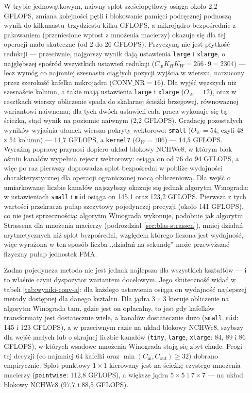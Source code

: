 \documentclass[a4paper,12pt]{book} %
\begin{document}
W trybie jednowątkowym, naiwny splot sześciopętlowy osiąga około 2,2 GFLOPS, zmiana kolejności pętli i blokowanie pamięci podręcznej podnoszą wynik do kilkunastu--trzydziestu kilku GFLOPS, a mikrojądro bezpośrednie z pakowaniem (przeniesione wprost z mnożenia macierzy) okazuje się dla tej operacji mało skuteczne (od 2 do 26 GFLOPS). Przyczyną nie jest płytkość redukcji --- przeciwnie, najgorszy wynik dają ustawienia \texttt{large} i \texttt{xlarge}, o najgłębszej spośród wszystkich ustawień redukcji ($C_{\mathrm{in}} K_H K_W = 256 \cdot 9 = 2304$) --- lecz wymóg co najmniej szesnastu ciągłych pozycji wyjścia w wierszu, narzucony przez szerokość kafelka mikrojądra ($\mathrm{CONV\_NR} = 16$). Dla wyjść węższych niż szesnaście kolumn, a takie mają ustawienia \texttt{large} i \texttt{xlarge} ($O_W = 12$), oraz w resztkach wierszy obliczenie spada do skalarnej ścieżki brzegowej, równoważnej wariantowi naiwnemu; dla tych dwóch ustawień cała praca wykonuje się tą ścieżką, stąd wynik na poziomie naiwnym (2,2 GFLOPS). Gradację pozostałych wyników wyjaśnia ułamek wiersza pokryty wektorowo: \texttt{small} ($O_W = 54$, czyli 48 z 54 kolumn) --- 11,7 GFLOPS, a \texttt{kernel7} ($O_W = 106$) --- 14,5 GFLOPS. Wyraźną poprawę przynosi dopiero układ blokowy NCHWc8, w którym blok ośmiu kanałów wypełnia rejestr wektorowy: osiąga on od 76 do 94 GFLOPS, a więc po raz pierwszy doprowadza splot bezpośredni w pobliże wydajności charakterystycznej dla operacji ograniczonej mocą obliczeniową. Dla wejść o umiarkowanej liczbie kanałów najszybszy okazuje się jednak algorytm Winograda: w ustawieniach \texttt{small} i \texttt{mid} osiąga on 145,1 oraz 123,2 GFLOPS. Pierwsza z tych wartości przekracza pułap szczytowy pojedynczej precyzji (około 141 GFLOPS), co nie jest sprzecznością: algorytm Winograda wykonuje, podobnie jak algorytm Strassena dla mnożenia macierzy (podrozdział \ref{sec:blas-strassen}), mniej działań arytmetycznych niż splot bezpośredni, względem którego liczona jest wydajność, więc wyrażona w ten sposób liczba ,,działań na sekundę'' może przewyższać fizyczny pułap jednostek FMA.

Żadna pojedyncza metoda nie jest jednak najlepsza dla wszystkich kształtów --- i to właśnie czyni dyspozytor wariantem docelowym. Jego skuteczność widać w tabeli \ref{tab:wyniki-conv-a}: dla każdego ustawienia osiąga on wydajność najlepszej metody dostępnej dla danego kształtu. Dla jądra $3 \times 3$ kieruje obliczenie na algorytm Winograda tam, gdzie jest on opłacalny, to jest gdy kafelków transformaty jest dostatecznie wiele, a kanałów dostatecznie dużo (\texttt{small}, \texttt{mid}: 145 i 123 GFLOPS), a w przeciwnym razie na układ blokowy NCHWc8, szybszy dla wejść małych lub o skrajnej liczbie kanałów (\texttt{tiny}, \texttt{large}, \texttt{xlarge}: 84, 89 i 86 GFLOPS), w których wsadowe mnożenia Winograda stają się zbyt chude. Progi tej decyzji (co najmniej $64$ kafelki oraz $\min(C_{\mathrm{in}}, C_{\mathrm{out}}) \ge 32$) dobrano empirycznie. Splot punktowy $1 \times 1$ kierowany jest na ścieżkę czystego mnożenia macierzy (\texttt{pointwise}: 112,8 GFLOPS), a większe jądra $5 \times 5$ i $7 \times 7$ --- na układ blokowy NCHWc8 (97,7 i 88,5 GFLOPS).
\end{document}
